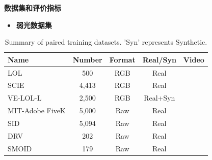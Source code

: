 \documentclass[CJK,aspectratio=169]{beamer}  %
\begin{document}
	\begin{frame}
		{ \yahei \textbf{数据集和评价指标}}
		
		\begin{itemize} 
			\item \textbf{弱光数据集}
		\end{itemize}
		
		\begin{table}[!htbp]
			\centering
			\tiny
				\begin{tabular}{>{\centering\arraybackslash}m{3cm}|c|c|c|c}
					
					\hline
					
					\textbf{Name} & \textbf{Number} & \textbf{Format} & \textbf{Real/Syn} & \textbf{Video} \\
					
					\hline
					
					LOL\textcolor{blue}{\citep{wei2018deep}} & 500 & RGB & Real & \\
					
					SCIE\textcolor{blue}{\citep{cai2018learning}} & 4,413 & RGB & Real & \\
					
					VE-LOL-L\textcolor{blue}{\citep{jiang2019learning}} & 2,500 & RGB & Real+Syn & \\
					
					MIT-Adobe FiveK\textcolor{blue}{\citep{bychkovsky2011learning}} & 5,000 & Raw & Real & \\
					
					SID\textcolor{blue}{\citep{wei2018deep}} & 5,094 & Raw & Real & \\
					
					DRV\textcolor{blue}{\citep{chen2019seeing}} & 202 & Raw & Real & \checkmark  \\
					
					SMOID\textcolor{blue}{\citep{jiang2019learning}} & 179 & Raw & Real & \checkmark  \\
					
					\hline
					
				\end{tabular}
			\captionsetup{font=scriptsize} %
			\caption{\label{tab: Paired_training_datases}
				Summary of paired training datasets. 'Syn' represents Synthetic.} %
			

\end{table}
\end{frame}
\end{document}
